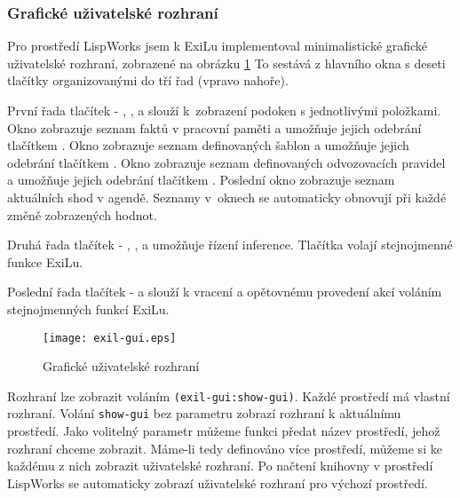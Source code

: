 \subsubsection{Grafické uživatelské rozhraní}
\label{guide gui}

Pro prostředí LispWorks jsem k ExiLu implementoval minimalistické grafické
uživatelské rozhraní, zobrazené na obrázku \ref{gui} To sestává z hlavního okna
s deseti tlačítky organizovanými do tří řad (vpravo nahoře).

První řada tlačítek - , ,  a 
slouží k~zobrazení podoken s jednotlivými položkami. Okno  zobrazuje
seznam faktů v pracovní paměti a umožňuje jejich odebrání tlačítkem
. Okno  zobrazuje seznam definovaných šablon a
umožňuje jejich odebrání tlačítkem . Okno 
zobrazuje seznam definovaných odvozovacích pravidel a umožňuje jejich odebrání
tlačítkem . Poslední okno  zobrazuje seznam
aktuálních shod v agendě. Seznamy v~oknech se automaticky obnovují při každé
změně zobrazených hodnot.

Druhá řada tlačítek - , ,  a  umožňuje
řízení inference. Tlačítka volají stejnojmenné funkce ExiLu.

Poslední řada tlačítek -  a  slouží k vracení a opětovnému
provedení akcí voláním stejnojmenných funkcí ExiLu.

\begin{figure}[h]
\texttt{[image: exil-gui.eps]}
\caption{Grafické uživatelské rozhraní}
\label{gui}
\end{figure}

Rozhraní lze zobrazit voláním \verb|(exil-gui:show-gui)|. Každé prostředí má
vlastní rozhraní. Volání \verb|show-gui| bez parametru zobrazí rozhraní k
aktuálnímu prostředí. Jako volitelný parametr můžeme funkci předat název
prostředí, jehož rozhraní chceme zobrazit. Máme-li tedy definováno více
prostředí, můžeme si ke každému z nich zobrazit uživatelské rozhraní. Po načtení
knihovny v prostředí LispWorks se automaticky zobrazí uživatelské rozhraní pro
výchozí prostředí.
